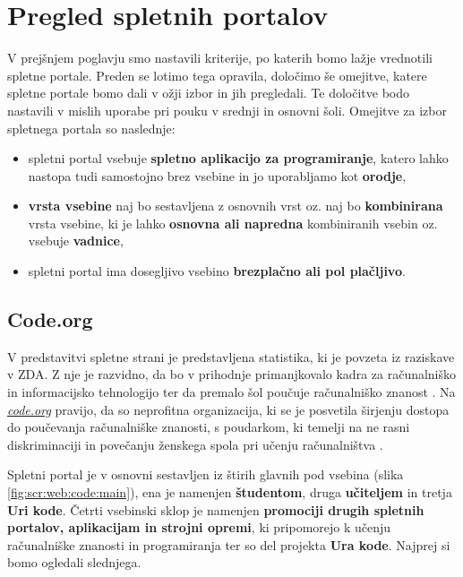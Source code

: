 \section{Pregled spletnih portalov}
\label{sec:pregled_spletnih_port}

V prejšnjem poglavju smo nastavili kriterije, po katerih bomo lažje
vrednotili spletne portale. Preden se lotimo tega opravila, določimo
še omejitve, katere spletne portale bomo dali v ožji izbor in jih
pregledali. Te določitve bodo nastavili v mislih uporabe pri pouku v
srednji in osnovni šoli. Omejitve za izbor spletnega portala so
naslednje:

\begin{itemize}
  \tightlist
\item spletni portal vsebuje \textbf{spletno aplikacijo za
    programiranje}, katero lahko nastopa tudi samostojno brez vsebine
  in jo uporabljamo kot \textbf{orodje},
\item \textbf{vrsta vsebine} naj bo sestavljena z osnovnih vrst
  oz. naj bo \textbf{kombinirana} vrsta vsebine, ki je lahko
  \textbf{osnovna ali napredna} kombiniranih vsebin oz. vsebuje
  \textbf{vadnice},
\item spletni portal ima dosegljivo vsebino \textbf{brezplačno ali pol
  plačljivo}. 
\end{itemize}

\subsection{Code.org}
\label{sec:Code.org}

V predstavitvi spletne strani je predstavljena statistika, ki je
povzeta iz raziskave v ZDA. Z nje je razvidno, da bo v prihodnje
primanjkovalo kadra za računalniško in informacijsko tehnologijo ter
da premalo šol poučuje računalniško znanost
\cite{web:code.org:promote}. Na
\emph{\href{https://code.org}{code.org}} \cite{web:code.org} pravijo,
da so neprofitna organizacija, ki se je posvetila širjenju dostopa do
poučevanja računalniške znanosti, s poudarkom, ki temelji na ne rasni
diskriminaciji in povečanju ženskega spola pri učenju računalništva
\cite{web:code.org:about}.

Spletni portal je v osnovni sestavljen iz štirih glavnih pod vsebina
(slika \ref{fig:scr:web:code:main}), ena je namenjen
\textbf{študentom}, druga \textbf{učiteljem} in tretja \textbf{Uri
  kode}. Četrti vsebinski sklop je namenjen \textbf{promociji drugih
  spletnih portalov, aplikacijam in strojni opremi}, ki pripomorejo k
učenju računalniške znanosti in programiranja ter so del projekta
\textbf{Ura kode}. Najprej si bomo ogledali slednjega.

